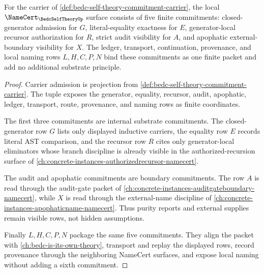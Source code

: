 \begin{theorem}
\label{thm:bedc-self-theory-namecert-obligations}
For the carrier of \autoref{def:bedc-self-theory-commitment-carrier}, the local $\NameCert_{\BedcSelfTheoryUp}$ surface consists of five finite commitments: closed-generator admission for $G$, literal-equality exactness for $E$, generator-local recursor authorization for $R$, strict audit visibility for $A$, and apophatic external-boundary visibility for $X$. The ledger, transport, continuation, provenance, and local naming rows $L,H,C,P,N$ bind these commitments as one finite packet and add no additional substrate principle.
\end{theorem}
\begin{proof}
Carrier admission is projection from \autoref{def:bedc-self-theory-commitment-carrier}. The tuple exposes the generator, equality, recursor, audit, apophatic, ledger, transport, route, provenance, and naming rows as finite coordinates.

The first three commitments are internal substrate commitments. The closed-generator row $G$ lists only displayed inductive carriers, the equality row $E$ records literal AST comparison, and the recursor row $R$ cites only generator-local eliminators whose branch discipline is already visible in the authorized-recursion surface of \autoref{ch:concrete-instances-authorizedrecursor-namecert}.

The audit and apophatic commitments are boundary commitments. The row $A$ is read through the audit-gate packet of \autoref{ch:concrete-instances-auditgateboundary-namecert}, while $X$ is read through the external-name discipline of \autoref{ch:concrete-instances-apophaticname-namecert}. Thus purity reports and external supplies remain visible rows, not hidden assumptions.

Finally $L,H,C,P,N$ package the same five commitments. They align the packet with \autoref{ch:bedc-is-its-own-theory}, transport and replay the displayed rows, record provenance through the neighboring NameCert surfaces, and expose local naming without adding a sixth commitment.
\end{proof}

